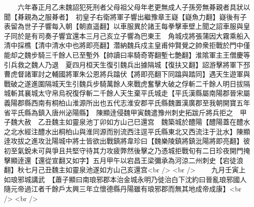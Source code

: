 　　六年春正月乙未魏詔犯死刑者父母祖父母年老更無成人子孫旁無朞親者具狀以聞【朞親為之服朞者】　初皇子右衛將軍子響出繼豫章王嶷【嶷魚力翻】嶷後有子表留為世子子響每入朝【朝直遥翻】以車服異於諸王每拳擊車壁上聞之詔車服與皇子同於是有司奏子響宜還本三月己亥立子響為巴東王　角城戍將張蒲因大霧乘船入清中採樵【清中清水中也將即亮翻】濳納魏兵戍主皇甫仲賢覺之帥衆拒戰於門中僅能却之魏步騎三千餘人已至塹外【帥讀曰率騎奇寄翻塹七艶翻】淮隂軍主王僧慶等引兵救之魏人乃退　夏四月桓天生復引魏兵出據隔城【復扶又翻】詔游擊將軍下邳曹虎督諸軍討之輔國將軍朱公恩將兵蹹伏【將即亮翻下同蹹與踏同】遇天生遊軍與戰破之遂進圍隔城天生引魏兵步騎萬餘人來戰虎奮擊大破之俘斬二千餘人明日拔隔城斬其襄城太守帛烏祝復俘斬二千餘人天生棄平氏城走【平氏漢縣屬南陽郡晉宋屬義陽郡縣西南有桐柏山淮源所出也五代志淮安郡平氏縣魏置漢廣郡至我朝開寶五年省平氏縣為鎮入唐州泌陽縣】　陳顯逹侵魏甲寅魏遣豫州刺史拓跋斤將兵拒之　甲子魏大赦　乙丑魏主如靈泉池丁卯如方山己巳還宫　魏築城於醴陽【醴陽蓋在醴水之北水經注醴水出桐柏山與淮同源而别流西注逕平氏縣東北又西流注于沘水】陳顯逹攻拔之進攻沘陽城中將士皆欲出戰鎮將韋珍曰【魏樂陵鎮將鎮沘陽將即亮翻】彼初至氣銳未可與爭且共堅守待其力攻疲弊然後擊之乃憑城拒戰旬有二日珍夜開門掩擊顯逹還【還從宣翻又如字】五月甲午以宕昌王梁彌承為河涼二州刺史【宕徒浪翻】秋七月己丑魏主如靈泉池遂如方山己亥還宫<br />
<br />
　　九月壬寅上如琅邪城講武　【蕭子顯曰南琅邪郡本治金城永明乃徙治白下沈約曰晉亂琅邪國人隨元帝過江者千餘戶太興三年立懷德縣丹陽雖有琅邪郡而無其地成帝成康】<br />
<br />
